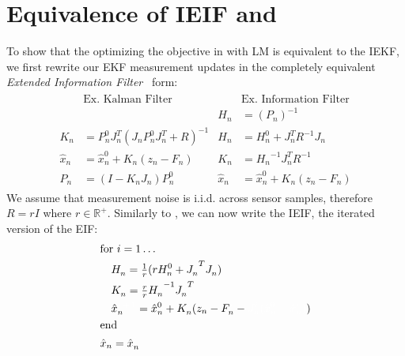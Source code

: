\section{Equivalence of IEIF and }
\label{app:ieif-lm}

To show that the optimizing the objective in  with LM is equivalent to the IEKF, we first rewrite our EKF measurement updates in the completely equivalent \emph{Extended Information Filter}~\cite{anderson1979optimal} form:
% 
\begin{gather*}
\begin{aligned}
&\text{Ex. Kalman Filter}                           &       &\text{Ex. Information Filter} \\
&                                                   &       H_n &= \left(P_n\right)^{-1} \\
K_n &= P_n^0 J_n^T(J_n P_n^0 J_n^T + R)^{-1}        &       H_n &= H_n^0 + J_n^T R^{-1} J_n \\
\hat{x}_n &= \hat{x}_n^0 + K_n(z_n - F_n)           &       K_n &= {H_n}^{-1} J_n^T R^{-1} \\
P_n &= (I - K_n J_n)P_n^0                           &       \hat{x}_n &= \hat{x}_n^0 + K_n (z_n - F_n)
\end{aligned}
\label{eq:ekf-eif}
\end{gather*}
%  
We assume that measurement noise is i.i.d. across sensor samples, therefore $R=rI$ where $r\in \mathbb{R}^+$. Similarly to , we can now write the IEIF, the iterated version of the EIF:
\begin{gather}
\begin{aligned}
&\text{for } i=1 \dots  \\
&\quad H_n^\textit{\color{accent}$i$} = \tfrac{1}{r} (r H_n^0 +{J_n^\textit{\color{accent}$i$}}^T J_n^\textit{\color{accent}$i$}) \\
&\quad K_n^\textit{\color{accent}$i$} =\tfrac{r}{r} {H_n^\textit{\color{accent}$i$}}^{-1} {J_n^\textit{\color{accent}$i$}}^T \\
&\quad \hat{x}_n^\textit{\color{accent}$i + 1$} = \hat{x}_n^0 + K_n^\textit{\color{accent}$i$}(z_n - F_n^\textit{\color{accent}$i$} - \textit{\color{accent} $J_n^i(\hat{x}_n^0 - \hat{x}_n^i)$}) \\
&\text{end} \\
&\hat{x}_n = \hat{x}_n^\textit{\color{accent}$i$}
\end{aligned}
\end{gather}

